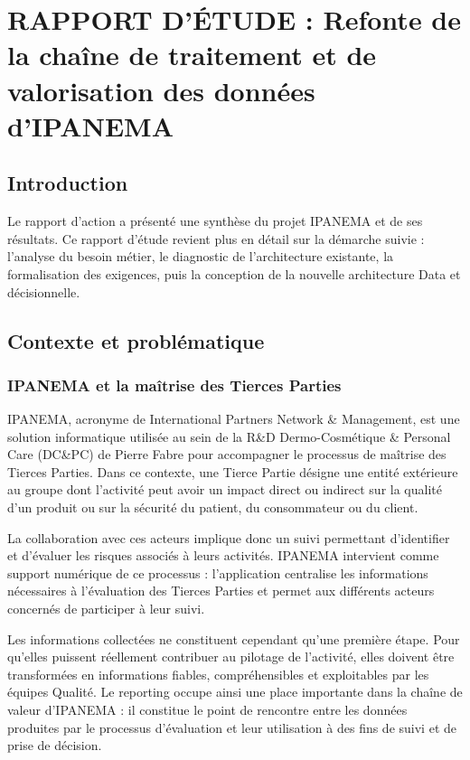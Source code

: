 \chapter{ RAPPORT D’ÉTUDE : Refonte de la chaîne de traitement et de valorisation des données d’IPANEMA }
\minitoc
\label{chap2}

\setlength{\emergencystretch}{3em}

\newpage

\section{Introduction}
Le rapport d'action a présenté une synthèse du projet IPANEMA et de ses résultats. Ce rapport 
d'étude revient plus en détail sur la démarche suivie : l'analyse du besoin métier, le diagnostic 
de l'architecture existante, la formalisation des exigences, puis la conception de la nouvelle 
architecture Data et décisionnelle. 

\section{ Contexte et problématique}
\label{sec:sec22}
\subsection{ IPANEMA et la maîtrise des Tierces Parties }
IPANEMA, acronyme de International Partners Network \& Management, est une solution 
informatique utilisée au sein de la R\&D Dermo-Cosmétique \& Personal Care (DC\&PC) de 
Pierre Fabre pour accompagner le processus de maîtrise des Tierces Parties. Dans ce 
contexte, une Tierce Partie désigne une entité extérieure au groupe dont l’activité peut avoir 
un impact direct ou indirect sur la qualité d’un produit ou sur la sécurité du patient, du 
consommateur ou du client.

La collaboration avec ces acteurs implique donc un suivi permettant d’identifier et 
d’évaluer les risques associés à leurs activités. IPANEMA intervient comme support 
numérique de ce processus : l’application centralise les informations nécessaires à l’évaluation 
des Tierces Parties et permet aux différents acteurs concernés de participer à leur suivi.

Les informations collectées ne constituent cependant qu’une première étape. Pour 
qu’elles puissent réellement contribuer au pilotage de l’activité, elles doivent être transformées 
en informations fiables, compréhensibles et exploitables par les équipes Qualité. Le reporting 
occupe ainsi une place importante dans la chaîne de valeur d’IPANEMA : il constitue le point 
de rencontre entre les données produites par le processus d’évaluation et leur utilisation à des 
fins de suivi et de prise de décision.

